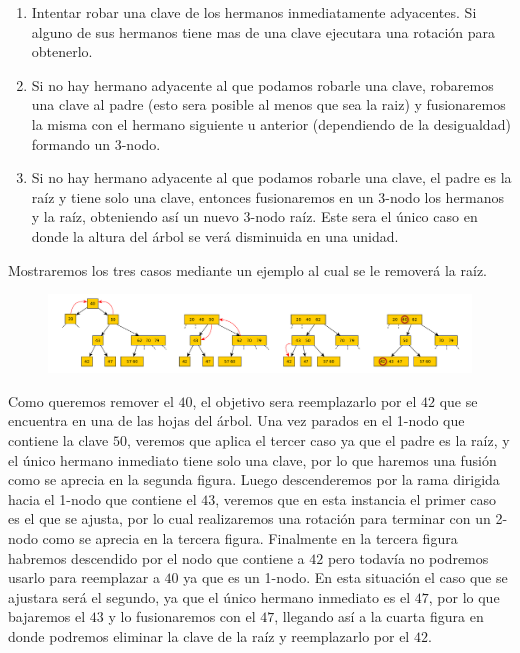 \begin{enumerate}
 \item Intentar robar una clave de los hermanos inmediatamente adyacentes. Si alguno de sus hermanos tiene mas de una clave ejecutara una rotaci\'on para obtenerlo.
 \item Si no hay hermano adyacente al que podamos robarle una clave, robaremos una clave al padre (esto sera posible al menos que sea la raiz) y fusionaremos la misma con el hermano siguiente u anterior (dependiendo de la desigualdad) formando un 3-nodo.
 \item Si no hay hermano adyacente al que podamos robarle una clave, el padre es la ra\'iz y tiene solo una clave, entonces fusionaremos en un 3-nodo los hermanos y la ra\'iz, obteniendo as\'i un nuevo 3-nodo ra\'iz. Este sera el \'unico caso en donde la altura del \'arbol se ver\'a disminuida en una unidad.
\end{enumerate}

Mostraremos los tres casos mediante un ejemplo al cual se le remover\'a la ra\'iz.

\begin{figure}
 \centering
 \includegraphics[width=1\textwidth]{graficos/EliminacionArboles234.pdf}
\end{figure}

Como queremos remover el $40$, el objetivo sera reemplazarlo por el $42$ que se encuentra en una de las hojas del \'arbol. Una vez parados en el 1-nodo que contiene la clave $50$, veremos que aplica el tercer caso ya que el padre es la ra\'iz, y el \'unico hermano inmediato tiene solo una clave, por lo que haremos una fusi\'on como se aprecia en la segunda figura. Luego descenderemos por la rama dirigida hacia el 1-nodo que contiene el $43$, veremos que en esta instancia el primer caso es el que se ajusta, por lo cual realizaremos una rotaci\'on para terminar con un 2-nodo como se aprecia en la tercera figura. Finalmente en la tercera figura habremos descendido por el nodo que contiene a $42$ pero todav\'ia no podremos usarlo para reemplazar a $40$ ya que es un 1-nodo. En esta situaci\'on el caso que se ajustara ser\'a el segundo, ya que el \'unico hermano inmediato es el $47$, por lo que bajaremos el $43$ y lo fusionaremos con el $47$, llegando as\'i a la cuarta figura en donde podremos eliminar la clave de 
la ra\'iz y 
reemplazarlo por el $42$.

